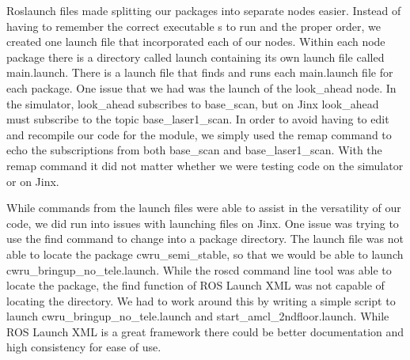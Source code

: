 Roslaunch files made splitting our packages into separate nodes easier. 
Instead of having to remember the correct executable s to run and the proper order, 
we created one launch file that incorporated each of our nodes. 
Within each node package there is a directory called launch containing its own launch file called main.launch. 
There is a launch file that finds and runs each main.launch file for each package. 
One issue that we had was the launch of the look\_ahead node. In the simulator, 
look\_ahead subscribes to base\_scan, but on Jinx look\_ahead must subscribe to the topic base\_laser1\_scan. 
In order to avoid having to edit and recompile our code for the module, we simply used the remap command to echo 
the subscriptions from both base\_scan and base\_laser1\_scan. With the remap command it did not matter 
whether we were testing code on the simulator or on Jinx.

While commands from the launch files were able to assist in the versatility of our code, we did run into issues 
with launching files on Jinx. One issue was trying to use the find command to change into a package directory. The 
launch file was not able to locate the package cwru\_semi\_stable, so that we would be able to
 launch cwru\_bringup\_no\_tele.launch. While the roscd command line tool was able to locate the package, 
the find function of ROS Launch XML was not capable of locating the directory. We had to work around this by 
writing a simple script to launch cwru\_bringup\_no\_tele.launch and start\_amcl\_2ndfloor.launch.
While ROS Launch XML is a great framework there could be better documentation and high consistency for ease of use.

